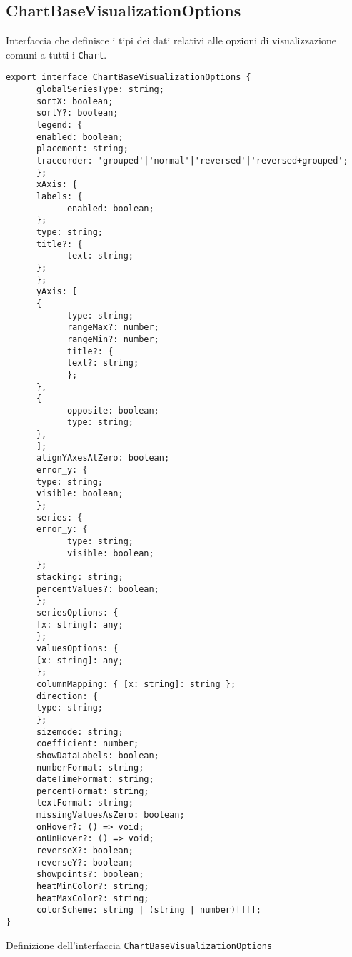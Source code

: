 \subsection{ChartBaseVisualizationOptions}
Interfaccia che definisce i tipi dei dati relativi alle opzioni di visualizzazione comuni a tutti i \texttt{Chart}.
\begin{verbatim}
export interface ChartBaseVisualizationOptions {
      globalSeriesType: string; 
      sortX: boolean;
      sortY?: boolean;
      legend: {
      enabled: boolean;
      placement: string;
      traceorder: 'grouped'|'normal'|'reversed'|'reversed+grouped';
      };
      xAxis: {
      labels: {
            enabled: boolean;
      };
      type: string;
      title?: {
            text: string;
      };
      };
      yAxis: [
      {
            type: string;
            rangeMax?: number;
            rangeMin?: number;
            title?: {
            text?: string;
            };
      },
      {
            opposite: boolean;
            type: string;
      },
      ];
      alignYAxesAtZero: boolean;
      error_y: {
      type: string;
      visible: boolean;
      };
      series: {
      error_y: {
            type: string;
            visible: boolean;
      };
      stacking: string;
      percentValues?: boolean;
      };
      seriesOptions: {
      [x: string]: any;
      };
      valuesOptions: {
      [x: string]: any;
      };
      columnMapping: { [x: string]: string };
      direction: {
      type: string;
      };
      sizemode: string;
      coefficient: number;
      showDataLabels: boolean;
      numberFormat: string;
      dateTimeFormat: string;
      percentFormat: string;
      textFormat: string;
      missingValuesAsZero: boolean;
      onHover?: () => void;
      onUnHover?: () => void;
      reverseX?: boolean;
      reverseY?: boolean;
      showpoints?: boolean;
      heatMinColor?: string;
      heatMaxColor?: string;
      colorScheme: string | (string | number)[][];
}
\end{verbatim}
\begin{listing}[H]
      \caption{Definizione dell'interfaccia \texttt{ChartBaseVisualizationOptions}}
      \label{listing:chartBaseVisualizationOptions}
\end{listing}
